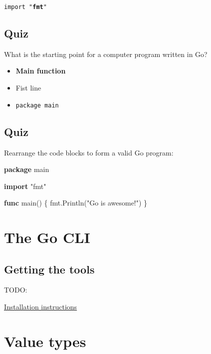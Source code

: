 \documentclass[]{book}
\newenvironment{Shaded}{\begin{snugshade}}{\end{snugshade}}
\newcommand{\KeywordTok}[1]{\textcolor[rgb]{0.13,0.29,0.53}{\textbf{#1}}}
\newcommand{\NormalTok}[1]{#1}
\newcommand{\StringTok}[1]{\textcolor[rgb]{0.31,0.60,0.02}{#1}}
\providecommand{\tightlist}{%
  \setlength{\itemsep}{0pt}\setlength{\parskip}{0pt}}
\begin{document}
\texttt{import\ "}\textbf{\texttt{fmt}}\texttt{"}

\hypertarget{quiz-3}{%
\subsection{Quiz}\label{quiz-3}}

What is the starting point for a computer program written in Go?

\begin{itemize}
\tightlist
\item
  \textbf{Main function}
\item
  Fist line
\item
  \texttt{package\ main}
\end{itemize}

\hypertarget{quiz-4}{%
\subsection{Quiz}\label{quiz-4}}

Rearrange the code blocks to form a valid Go program:

\begin{Shaded}
\begin{Highlighting}[]
\KeywordTok{package}\NormalTok{ main}

\KeywordTok{import} \StringTok{"fmt"}

\KeywordTok{func}\NormalTok{ main() \{}
\NormalTok{    fmt.Println(}\StringTok{"Go is awesome!"}\NormalTok{)}
\NormalTok{\}}
\end{Highlighting}
\end{Shaded}

\hypertarget{the-go-cli}{%
\section{The Go CLI}\label{the-go-cli}}

\hypertarget{getting-the-tools}{%
\subsection{Getting the tools}\label{getting-the-tools}}

TODO:

\href{https://golang.org/doc/install}{Installation instructions}

\hypertarget{value-types}{%
\section{Value types}\label{value-types}}
\end{document}
